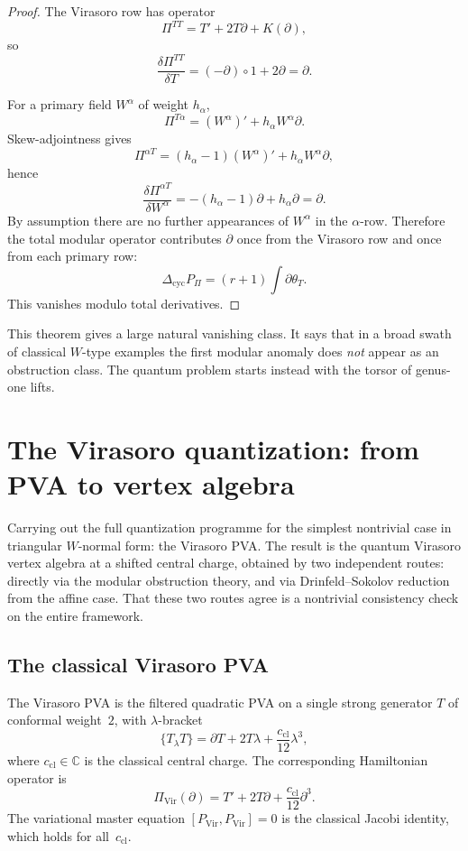 \begin{proof}
The Virasoro row has operator
\[
\Pi^{TT}=T'+2T\partial+K(\partial),
\]
so
\[
\frac{\delta \Pi^{TT}}{\delta T}=(-\partial)\circ 1 + 2\partial=\partial.
\]

For a primary field $W^\alpha$ of weight $h_\alpha$,
\[
\Pi^{T\alpha}=(W^\alpha)'+h_\alpha W^\alpha\partial.
\]
Skew-adjointness gives
\[
\Pi^{\alpha T}=(h_\alpha-1)(W^\alpha)'+h_\alpha W^\alpha\partial,
\]
hence
\[
\frac{\delta \Pi^{\alpha T}}{\delta W^\alpha}
=-(h_\alpha-1)\partial+h_\alpha\partial=\partial.
\]
By assumption there are no further appearances of $W^\alpha$ in the $\alpha$-row. Therefore
the total modular operator contributes $\partial$ once from the Virasoro row and once from
each primary row:
\[
\Delta_{\mathrm{cyc}}P_\Pi=(r+1)\int \partial \theta_T.
\]
This vanishes modulo total derivatives.
\end{proof}

\begin{remark}
This theorem gives a large natural vanishing class. It says that in a broad swath of
classical $W$-type examples the first modular anomaly does \emph{not} appear as an
obstruction class. The quantum problem starts instead with the torsor of genus-one lifts.
\end{remark}

\section{The Virasoro quantization: from PVA to vertex algebra}
\label{sec:virasoro-quantization}

Carrying out the full quantization programme for the simplest nontrivial
case in triangular $W$-normal form: the Virasoro PVA. The result is the
quantum Virasoro vertex algebra at a shifted central charge, obtained by
two independent routes: directly via the modular obstruction theory, and
via Drinfeld--Sokolov reduction from the affine case. That these two routes
agree is a nontrivial consistency check on the entire framework.

\subsection{The classical Virasoro PVA}
\label{subsec:virasoro-classical-pva}

The Virasoro PVA is the filtered quadratic PVA on a single strong generator
$T$ of conformal weight~$2$, with $\lambda$-bracket
\begin{equation}\label{eq:virasoro-pva-bracket}
\{T_\lambda T\} = \partial T + 2T\lambda + \frac{c_{\mathrm{cl}}}{12}\lambda^3,
\end{equation}
where $c_{\mathrm{cl}}\in\mathbb C$ is the classical central charge.
The corresponding Hamiltonian operator is
\[
\Pi_{\mathrm{Vir}}(\partial) = T' + 2T\partial + \frac{c_{\mathrm{cl}}}{12}\partial^3.
\]
The variational master equation $[P_{\mathrm{Vir}},P_{\mathrm{Vir}}]=0$ is
the classical Jacobi identity, which holds for all~$c_{\mathrm{cl}}$.

